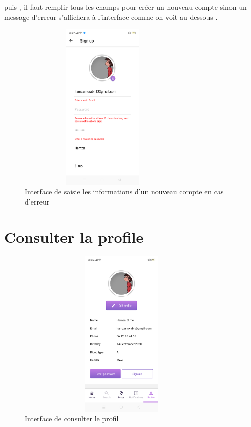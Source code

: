 puis , il faut remplir tous les champs pour créer un nouveau compte sinon un message d'erreur s'affichera à l'interface comme on voit au-dessous .
\begin{figure}[H]
  \centering
\includegraphics[width=8cm,height=8cm,keepaspectratio]{Application/insc1.png} 
\caption{Interface de saisie les informations d'un nouveau compte en cas d'erreur}
\end{figure}




\section{Consulter la profile }
\begin{figure}[H]
  \centering
\includegraphics[width=10cm,height=8cm,keepaspectratio]{Application/med22.png} 
\caption{Interface de  consulter le profil}
\end{figure}


